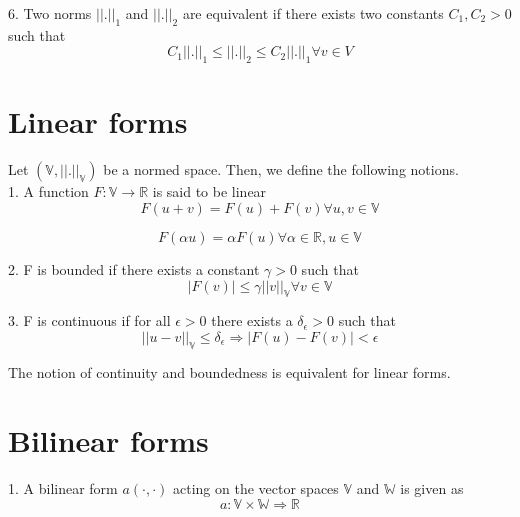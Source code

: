 \documentclass[a4paper]{book}
\begin{document}
6. Two norms $||.||_1$ and $||.||_2$ are equivalent if there exists two constants $C_1,C_2 > 0$ such that \\

\begin{equation} \label{norm_equivalent}
C_1||.||_1 \leq ||.||_2 \leq C_2 ||.||_1 \forall v \in V
\end{equation}

\section{Linear forms}

Let $(\mathbb{V,||.||_\mathbb{V}})$ be a normed space. Then, we define the following notions.\\

1. A function $F : \mathbb{V} \rightarrow \mathbb{R}$ is said to be linear
\begin{equation} 
F(u+v) = F(u) + F(v) \forall u,v \in \mathbb{V} 
\end{equation}

\begin{equation} 
F(\alpha u) = \alpha F(u) \forall \alpha \in \mathbb{R}, u \in \mathbb{V}
\end{equation}

2. F is bounded if there exists a constant $\gamma > 0$ such that
\begin{equation} 
|F(v)| \leq \gamma ||v||_\mathbb{V} \forall v \in \mathbb{V}
\end{equation}

3. F is continuous if for all $\epsilon > 0$ there exists a $\delta_\epsilon > 0$ such that \\
\begin{equation}
||u - v||_\mathbb{V} \leq \delta_\epsilon \Rightarrow  |F(u) - F(v)| < \epsilon
\end{equation}

The notion of continuity and boundedness is equivalent for linear forms.

\section{Bilinear forms}

1. A bilinear form $a(\cdot,\cdot)$ acting on the vector spaces $\mathbb{V}$ and $\mathbb{W}$ is given as
\begin{equation}
a : \mathbb{V} \times \mathbb{W} \Rightarrow \mathbb{R}
\end{equation}
\end{document}
